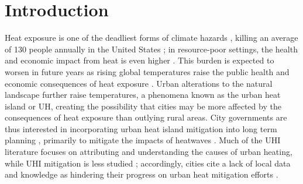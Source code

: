 \documentclass[draft,linenumbers]{agujournal}
\begin{document}
\section{Introduction}\label{sec:intro}
Heat exposure is one of the deadliest forms of climate hazards \cite{wmo}, killing an average of 130 people annually in the United States \citep{usnh_stat}; in resource-poor settings, the health and economic impact from heat is even higher \citep{wmo}. This burden is expected to worsen in future years as rising global temperatures raise the public health and economic consequences of heat exposure \citep{ipcc}. 
Urban alterations to the natural landscape further raise temperatures, a phenomena known as the urban heat island or UH, creating the possibility that cities may be more affected by the consequences of heat exposure than outlying rural areas.
City governments are thus interested in incorporating urban heat island mitigation into long term planning \citep{shickman2016current}, primarily to mitigate the impacts of heatwaves \citep{hewitt2014cool}. Much of the UHI literature focuses on attributing and understanding the causes of urban heating, while UHI mitigation is less studied \citep{huang2018urban}; accordingly, cities cite a lack of local data and knowledge as hindering their progress on urban heat mitigation efforts \citep{hewitt2014cool}. %
 
\end{document}
